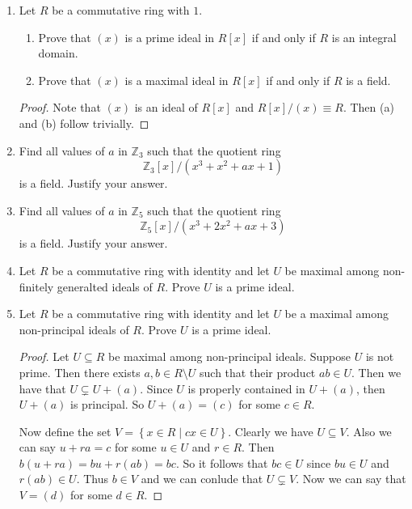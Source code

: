 \documentclass{article}
\theoremstyle{definition}
\newcommand{\Z}{\mathbb{Z}}
\newcommand{\set}[1]{\left\{#1\right\}}
\begin{document}
\begin{enumerate}
            \item Let $R$ be a commutative ring with $1$.
                
                \begin{enumerate}
                    \item Prove that $(x)$ is a prime ideal in $R[x]$ if and only if $R$ is an integral domain.
                    \item Prove that $(x)$ is a maximal ideal in $R[x]$ if and only if $R$ is a field.
                \end{enumerate}
            
            \begin{proof}
                Note that $(x)$ is an ideal of $R[x]$ and $R[x]/(x) \equiv R$. Then (a) and (b) follow trivially.
            \end{proof}

            \item Find all values of $a$ in $\Z_3$ such that the quotient ring \[\Z_3[x]/(x^3+x^2+ax+1)\] is a field. Justify your answer.
            
            \item Find all values of $a$ in $\Z_5$ such that the quotient ring \[\Z_5[x]/(x^3+2x^2+ax+3)\] is a field. Justify your answer.
            
            \item Let $R$ be a commutative ring with identity and let $U$ be maximal among non-finitely generalted ideals of $R$. Prove $U$ is a prime ideal.
        

            \item Let $R$ be a commutative ring with identity and let $U$ be a maximal among non-principal ideals of $R$. Prove $U$ is a prime ideal. 
            
            \begin{proof}
                Let $U\subseteq R$ be maximal among non-principal ideals. Suppose $U$ is not prime. Then there exists $a,b\in R\setminus U$ such that their product $ab\in U$. Then we have that $U\subsetneq U+(a)$. Since $U$ is properly contained in $U+(a)$, then $U+(a)$ is principal. So $U+(a)=(c)$ for some $c\in R$. 

                Now define the set $V=\set{x\in R \mid cx\in U}$. Clearly we have $U\subseteq V$. Also we can say $u+ra=c$ for some $u\in U$ and $r\in R$. Then $b(u+ra)=bu+r(ab)=bc$. So it follows that $bc\in U$ since $bu\in U$ and $r(ab)\in U$. Thus $b\in V$ and we can conlude that $U\subsetneq V$. Now we can say that $V=(d)$ for some $d\in R$. 


\end{proof}
\end{enumerate}
\end{document}
